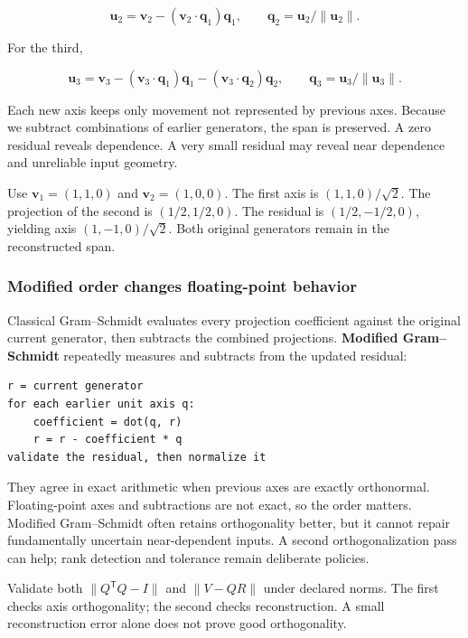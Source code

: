 \[
\mathbf u_2=\mathbf v_2-(\mathbf v_2\cdot\mathbf q_1)\mathbf q_1,
\qquad \mathbf q_2=\mathbf u_2/\|\mathbf u_2\|.
\]

For the third,

\[
\mathbf u_3=\mathbf v_3
-(\mathbf v_3\cdot\mathbf q_1)\mathbf q_1
-(\mathbf v_3\cdot\mathbf q_2)\mathbf q_2,
\qquad \mathbf q_3=\mathbf u_3/\|\mathbf u_3\|.
\]

Each new axis keeps only movement not represented by previous axes. Because we subtract combinations of earlier generators, the span is preserved. A zero residual reveals dependence. A very small residual may reveal near dependence and unreliable input geometry.

Use \(\mathbf v_1=(1,1,0)\) and \(\mathbf v_2=(1,0,0)\). The first axis is \((1,1,0)/\sqrt2\). The projection of the second is \((1/2,1/2,0)\). The residual is \((1/2,-1/2,0)\), yielding axis \((1,-1,0)/\sqrt2\). Both original generators remain in the reconstructed span.

\subsubsection{Modified order changes floating-point behavior}\label{01-foundations-i-ch017-modified-order-changes-floating-point-behavior}

\hypertarget{01-foundations-i-ch017-modified-order-changes-floating-point-behavior}{}

Classical Gram--Schmidt evaluates every projection coefficient against the original current generator, then subtracts the combined projections. \textbf{Modified Gram--Schmidt} repeatedly measures and subtracts from the updated residual:

\begin{verbatim}
r = current generator
for each earlier unit axis q:
    coefficient = dot(q, r)
    r = r - coefficient * q
validate the residual, then normalize it
\end{verbatim}

They agree in exact arithmetic when previous axes are exactly orthonormal. Floating-point axes and subtractions are not exact, so the order matters. Modified Gram--Schmidt often retains orthogonality better, but it cannot repair fundamentally uncertain near-dependent inputs. A second orthogonalization pass can help; rank detection and tolerance remain deliberate policies.

Validate both \(\|Q^\mathsf TQ-I\|\) and \(\|V-QR\|\) under declared norms. The first checks axis orthogonality; the second checks reconstruction. A small reconstruction error alone does not prove good orthogonality.

